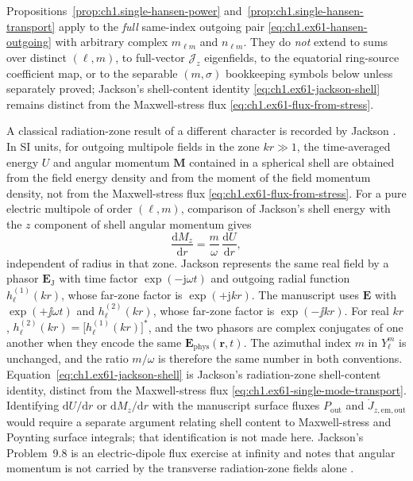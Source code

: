 \begin{remark}
\label{rem:ch1.single-multipole-scope}
Propositions~\ref{prop:ch1.single-hansen-power} and~\ref{prop:ch1.single-hansen-transport} apply to the \emph{full} same-index outgoing pair \eqref{eq:ch1.ex61-hansen-outgoing} with arbitrary complex $m_{\ell m}$ and $n_{\ell m}$. They do \emph{not} extend to sums over distinct $(\ell,m)$, to full-vector $\mathcal{J}_z$ eigenfields, to the equatorial ring-source coefficient map, or to the separable $(m,\sigma)$ bookkeeping symbols below unless separately proved; Jackson's shell-content identity \eqref{eq:ch1.ex61-jackson-shell} remains distinct from the Maxwell-stress flux \eqref{eq:ch1.ex61-flux-from-stress}.
\end{remark}

A classical radiation-zone result of a different character is recorded by Jackson \cite{jackson1999}. In SI units, for outgoing multipole fields in the zone $kr\gg 1$, the time-averaged energy $U$ and angular momentum $\mathbf M$ contained in a spherical shell are obtained from the field energy density and from the moment of the field momentum density, not from the Maxwell-stress flux \eqref{eq:ch1.ex61-flux-from-stress}. For a pure electric multipole of order $(\ell,m)$, comparison of Jackson's shell energy \cite[Eq.~(9.136)]{jackson1999} with the $z$ component of shell angular momentum \cite[Eqs.~(9.143)--(9.144)]{jackson1999} gives
\begin{equation}
\label{eq:ch1.ex61-jackson-shell}
\frac{\mathrm{d}M_z}{\mathrm{d}r}=\frac{m}{\omega}\,\frac{\mathrm{d}U}{\mathrm{d}r},
\end{equation}
independent of radius in that zone. Jackson represents the same real field by a phasor $\mathbf E_{\mathrm{J}}$ with time factor $\exp(-\mathrm{j}\omega t)$ and outgoing radial function $h_\ell^{(1)}(kr)$, whose far-zone factor is $\exp(+\mathrm{j}kr)$. The manuscript uses $\mathbf E$ with $\exp(+\jj\omega t)$ and $h_\ell^{(2)}(kr)$, whose far-zone factor is $\exp(-\jj kr)$. For real $kr$, $h_\ell^{(2)}(kr)=\bigl[h_\ell^{(1)}(kr)\bigr]^*$, and the two phasors are complex conjugates of one another when they encode the same $\mathbf E_{\mathrm{phys}}(\mathbf r,t)$. The azimuthal index $m$ in $Y_\ell^m$ is unchanged, and the ratio $m/\omega$ is therefore the same number in both conventions. Equation~\eqref{eq:ch1.ex61-jackson-shell} is Jackson's radiation-zone shell-content identity, distinct from the Maxwell-stress flux \eqref{eq:ch1.ex61-single-mode-transport}. Identifying $\mathrm{d}U/\mathrm{d}r$ or $\mathrm{d}M_z/\mathrm{d}r$ with the manuscript surface fluxes $P_{\mathrm{out}}$ and $\dot J_{z,\mathrm{em,out}}$ would require a separate argument relating shell content to Maxwell-stress and Poynting surface integrals; that identification is not made here. Jackson's Problem~9.8 is an electric-dipole flux exercise at infinity and notes that angular momentum is not carried by the transverse radiation-zone fields alone \cite{jackson1999}.

